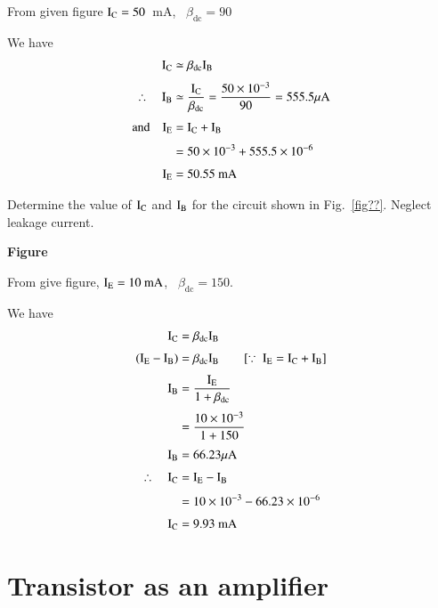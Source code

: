 \begin{solution}
From given figure $\textrm{I}_{\textrm{C}}=50$~mA, \ $\beta_{\text{dc}}=90$

We have
\begin{align*}
\textrm{I}_{\textrm{C}} &\simeq \beta_{\text{dc}}\textrm{I}_{\textrm{B}}\\[3pt]
\therefore\quad \textrm{I}_{\textrm{B}} &\simeq \frac{\textrm{I}_{\textrm{C}}}{\beta_{\text{dc}}}=\dfrac{50\times 10^{-3}}{90}=555.5\mu\textrm{A}\\[3pt]
\text{and}\quad \textrm{I}_{\textrm{E}} &= \textrm{I}_{\textrm{C}}+\textrm{I}_{\textrm{B}}\\[3pt]
&= 50\times 10^{-3}+555.5\times 10^{-6}\\[3pt]
\textrm{I}_{\textrm{E}} &= 50.55\text{~mA}
\end{align*}
\end{solution}

\begin{problem}\label{prob2.11}
Determine the value of $\textrm{I}_{\textrm{C}}$ and $\textrm{I}_{\textrm{B}}$ for the circuit shown in Fig.~\ref{fig??}. Neglect leakage current.
\begin{center}
{\bf Figure}
\end{center}
\end{problem}

\begin{solution}
From give figure, $\textrm{I}_{\textrm{E}}=10\text{~mA}$, \ $\beta_{\text{dc}}=150$.

We have
\begin{align*}
\textrm{I}_{\textrm{C}} &= \beta_{\text{dc}}\textrm{I}_{\textrm{B}}\\[3pt]
(\textrm{I}_{\textrm{E}}-\textrm{I}_{\textrm{B}}) &= \beta_{\text{dc}}\textrm{I}_{\textrm{B}}\qquad [\because \ \textrm{I}_{\textrm{E}}=\textrm{I}_{\textrm{C}}+\textrm{I}_{\textrm{B}}]\\[3pt]
\textrm{I}_{\textrm{B}} &= \frac{\textrm{I}_{\textrm{E}}}{1+\beta_{\text{dc}}}\\[3pt]
&= \frac{10\times 10^{-3}}{1+150}\\[3pt]
\textrm{I}_{\textrm{B}} &= 66.23\mu\textrm{A}\\[3pt]
\therefore\quad \textrm{I}_{\textrm{C}} &= \textrm{I}_{\textrm{E}}-\textrm{I}_{\textrm{B}}\\[3pt]
&= 10\times 10^{-3}-66.23\times 10^{-6}\\[3pt]
\textrm{I}_{\textrm{C}} &= 9.93\text{~mA}
\end{align*}
\end{solution}

\section{Transistor as an amplifier}\label{sec2.3}

